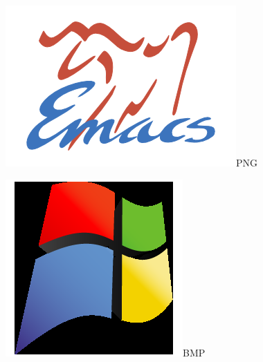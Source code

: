 \documentclass[a4paper]{article}
\begin{document}
\includegraphics[natwidth=33,natheight=23]{splash.png}PNG

\includegraphics[natwidth=256,natheight=256,scale=.25]{windows.bmp}BMP
\end{document}
